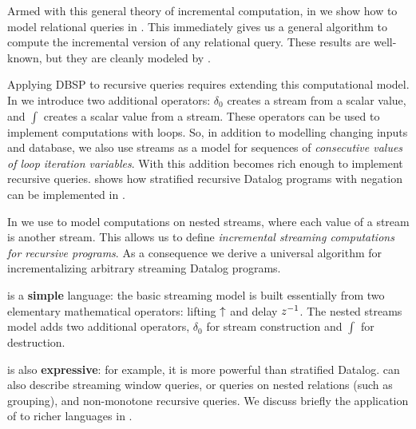 Armed with this general theory of incremental computation, in   
we show how to model relational queries in \dbsp.  This immediately gives
us a general algorithm to compute the incremental version of any relational query.
These results are well-known, but they are cleanly modeled by \dbsp.

Applying DBSP to recursive queries requires extending this computational model.  
In  we introduce two additional operators: $\delta_0$
creates a stream from a scalar value, and $\int$ creates a scalar value from a stream.  
These operators can be used to implement computations with  loops.
So, in addition to modelling changing inputs and database, we also
use streams as a model for sequences of \emph{consecutive values of loop
iteration variables}.  With this addition \dbsp becomes rich enough to implement 
recursive queries.   shows how stratified recursive
Datalog programs with negation can be implemented in \dbsp.  

In  we use \dbsp to model computations on nested streams, where each 
value of a stream is another stream.  This allows 
us to define \emph{incremental streaming computations for recursive programs}.  As a 
consequence we derive a universal algorithm for incrementalizing arbitrary streaming Datalog programs.

\dbsp is a \textbf{simple} language: 
the basic  \dbsp streaming model is built essentially from two elementary mathematical operators: lifting $\lift$ and delay $z^{-1}$.
The nested streams model adds two additional operators, $\delta_0$ for stream construction and $\int$ for destruction.


\dbsp is also \textbf{expressive}: for example, it is more powerful than stratified Datalog.  
\dbsp can also describe streaming window queries, or queries on nested relations (such as grouping),
and non-monotone recursive queries. 
We discuss briefly the application of \dbsp to richer languages in .

